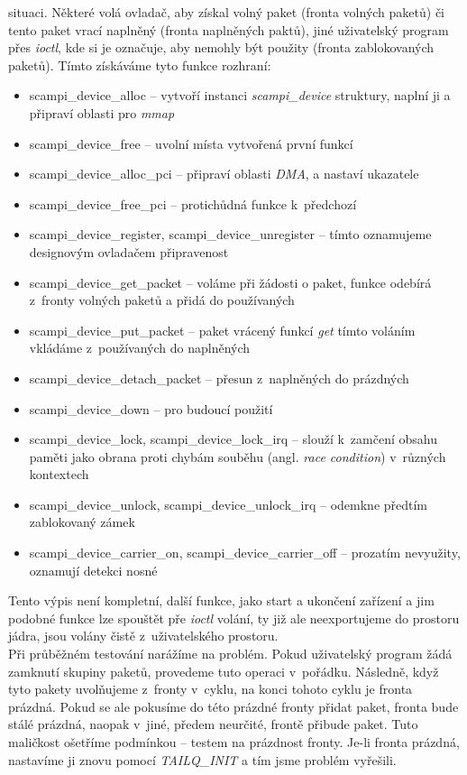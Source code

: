 \documentclass[final,11pt]{fithesis}
\newcommand{\dma}{\emph{DMA}}
\begin{document}
  situaci. Některé volá ovladač, aby získal volný paket (fronta volných paketů)
  či tento paket vrací naplněný (fronta naplněných paktů), jiné uživatelský
  program přes \emph{ioctl}, kde si je označuje,
  aby nemohly být použity (fronta zablokovaných paketů). Tímto získáváme tyto
  funkce rozhraní:
  \begin{itemize}
    \item scampi\_device\_alloc -- vytvoří instanci \emph{scampi\_device}
      struktury, naplní ji a připraví oblasti pro \emph{mmap}
    \item scampi\_device\_free -- uvolní místa vytvořená první funkcí
    \item scampi\_device\_alloc\_pci -- připraví oblasti \dma, a nastaví
      ukazatele
    \item scampi\_device\_free\_pci -- protichůdná funkce k~předchozí
    \item scampi\_device\_register, scampi\_device\_unregister -- tímto
      oznamujeme designovým ovladačem připravenost
    \item scampi\_device\_get\_packet -- voláme při žádosti o paket, funkce
      odebírá z~fronty volných paketů a přidá do používaných
    \item scampi\_device\_put\_packet -- paket vrácený funkcí \emph{get}
      tímto voláním vkládáme z~používaných do naplněných
    \item scampi\_device\_detach\_packet -- přesun z~naplněných do
      prázdných
    \item scampi\_device\_down -- pro budoucí použití
    \item scampi\_device\_lock, scampi\_device\_lock\_irq -- slouží
      k~zamčení obsahu paměti jako obrana proti chybám souběhu
      (angl. \emph{race condition}) v~různých kontextech
    \item scampi\_device\_unlock, scampi\_device\_unlock\_irq -- odemkne
      předtím zablokovaný zámek
    \item scampi\_device\_carrier\_on, scampi\_device\_carrier\_off --
      prozatím nevyužity, oznamují detekci nosné
  \end{itemize}
  Tento výpis není kompletní, další funkce, jako start a ukončení zařízení a
  jim podobné funkce lze spouštět pře \emph{ioctl} volání, ty již ale
  neexportujeme do prostoru jádra, jsou volány čistě z~uživatelského
  prostoru. \\ \indent
  Při průběžném testování narážíme na problém. Pokud uživatelský program žádá
  zamknutí skupiny paketů, provedeme tuto operaci v~pořádku. Následně, když
  tyto pakety uvolňujeme z~fronty v~cyklu, na konci tohoto cyklu je fronta
  prázdná. Pokud se ale pokusíme do této prázdné fronty přidat paket, fronta
  bude stálé prázdná, naopak v~jiné, předem neurčité, frontě přibude paket.
  Tuto maličkost ošetříme
  podmínkou -- testem na prázdnost fronty. Je-li fronta prázdná, nastavíme ji
  znovu pomocí \emph{TAILQ\_INIT} a tím jsme problém vyřešili.
\end{document}
